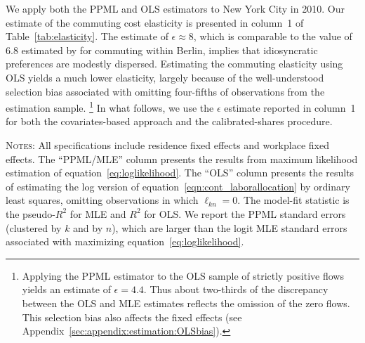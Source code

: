 \documentclass[11pt]{article}
\theoremstyle{definition}
\newcommand\idiosyncraticphrase{idiosyncratic preference}
\begin{document}
We apply both the PPML and OLS estimators to New York City in 2010.
Our estimate of the commuting cost elasticity is presented in column~1 of Table~\ref{tab:elasticity}.
The estimate of $\epsilon\approx8$,
which is comparable to the value of 6.8 estimated by \cite{AhlfeldtReddingSturmWolf:2015} for commuting within Berlin,
implies that \idiosyncraticphrase s are modestly dispersed.
Estimating the commuting elasticity using OLS yields a much lower elasticity,
largely because of the well-understood selection bias associated with omitting four-fifths of observations from the estimation sample.%
\footnote{%
Applying the PPML estimator to the OLS sample of strictly positive flows yields an estimate of $\epsilon=4.4$.
Thus about two-thirds of the discrepancy between the OLS and MLE estimates reflects the omission of the zero flows.
This selection bias also affects the fixed effects (see Appendix~\ref{sec:appendix:estimation:OLSbias}).
}
In what follows, we use the $\epsilon$ estimate reported in column~1 for both the covariates-based approach and the calibrated-shares procedure.
\begin{table}[hbt]
\caption{Commuting elasticity estimates}
\label{tab:elasticity}
\begin{center}
\vspace{-5mm}

\begin{minipage}{1.0\textwidth}
{\footnotesize \textsc{Notes}: 
All specifications include residence fixed effects and workplace fixed effects.
The ``PPML/MLE'' column presents the results from maximum likelihood estimation of equation~\eqref{eq:loglikelihood}.
The ``OLS'' column presents the results of estimating the log version of equation~\eqref{eqn:cont_laborallocation} by ordinary least squares, omitting observations in which $\ell_{kn}=0$.
The model-fit statistic is the pseudo-$R^2$ for MLE and $R^2$ for OLS.
We report the PPML standard errors (clustered by $k$ and by $n$), which are larger than the logit MLE standard errors associated with maximizing equation~\eqref{eq:loglikelihood}.
\par}
\end{minipage}
\end{center}
\end{table}
\end{document}
